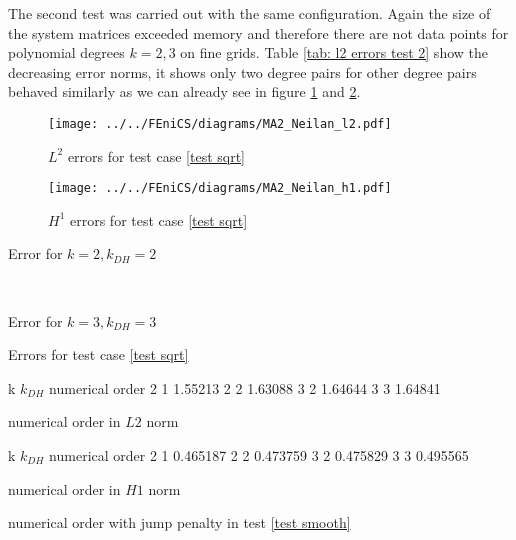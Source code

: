 The second test was carried out with the same configuration. Again the size of the system matrices exceeded memory and therefore there are not data points for polynomial degrees $k=2,3$ on fine grids. Table \ref{tab: l2 errors test 2} show the decreasing error norms, it shows only two degree pairs for other degree pairs behaved similarly as we can already see in figure \ref{fig: l2 errors test 2} and \ref{fig: h1 errors test 2}.
\begin{figure}[h]
\centering
	\texttt{[image: ../../FEniCS/diagrams/MA2\_Neilan\_l2.pdf]}
	\caption{$L^2$ errors for test case \ref{test sqrt} }
	\label{fig: l2 errors test 2}
\end{figure}
\begin{figure}[h]
	\centering
	\texttt{[image: ../../FEniCS/diagrams/MA2\_Neilan\_h1.pdf]}
	\caption{$H^1$ errors for test case \ref{test sqrt} }
	\label{fig: h1 errors test 2}
\end{figure}
\begin{table}[H]
	\begin{subtable}[b]{0.45\textwidth}
		\centering
		\pgfplotstabletypeset[
		columns={iterations, l2error, h1error,N},
		    every row 0 column 0/.style={set content=init},
		]{\MATwodegTwoTwo}
    	\caption{Error for $k=2, k_{DH}=2$}
   \end{subtable}
   ~
	\begin{subtable}[b]{0.45\textwidth}
		\centering
		\pgfplotstabletypeset[columns={iterations, l2error, h1error,N},
		    every row 0 column 0/.style={set content=init},
		]{\MATwodegThreeThree}
	\caption{Error for $k=3, k_{DH}=3$}
	\end{subtable}
	\caption{Errors for test case \ref{test sqrt}}
	\label{tab: l2 errors test 2}
\end{table}

\begin{table}[H]
\centering
\begin{subtable}[b]{0.45\textwidth}
	\pgfplotstabletypeset
	{
		k $k_{DH}$ {numerical order}
		2 1 1.55213
		2 2 1.63088 
		3 2 1.64644
		3 3 1.64841
	}
	\caption{numerical order in $L2$ norm}
	\end{subtable}
	\begin{subtable}[b]{0.45\textwidth}
	\pgfplotstabletypeset
	{
		k $k_{DH}$ {numerical order}
		2 1 0.465187
		2 2 0.473759
		3 2 0.475829
		3 3  0.495565
	}
	\caption{numerical order in $H1$ norm}
	\end{subtable}
	\caption{numerical order with jump penalty in test \ref{test smooth}}
\label{tab: order jump test 2}
\end{table}

